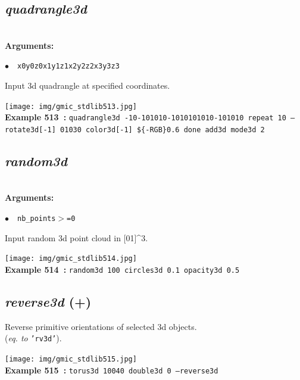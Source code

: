 \documentclass[a4paper,10.5pt,twoside]{book}
\def\comma{\discretionary{,}{}{,}}
\newcommand{\Cb}[1]{\textcolor{cb}{#1}}
\begin{document}
\subsection{\emph{quadrangle3d} }\vspace*{-0.7em}
~\\\textbf{\Cb{Arguments: }}\begin{flushleft}
{\small \Cb{\hspace*{0.5cm}$\bullet$~~\texttt{x0{\comma}y0{\comma}z0{\comma}x1{\comma}y1{\comma}z1{\comma}x2{\comma}y2{\comma}z2{\comma}x3{\comma}y3{\comma}z3}}}\end{flushleft}
Input 3d quadrangle at specified coordinates.
\begin{center}\texttt{[image: img/gmic\_stdlib513.jpg]}\\
{\footnotesize \textbf{Example 513~:} \texttt{quadrangle3d -10{\comma}-10{\comma}10{\comma}10{\comma}-10{\comma}10{\comma}10{\comma}10{\comma}10{\comma}-10{\comma}10{\comma}10 repeat 10 --rotate3d[-1] 0{\comma}1{\comma}0{\comma}30 color3d[-1] \$\{-RGB\}{\comma}0.6 done add3d mode3d 2}}
\end{center}

\subsection{\emph{random3d} }\vspace*{-0.7em}
~\\\textbf{\Cb{Arguments: }}\begin{flushleft}
{\small \Cb{\hspace*{0.5cm}$\bullet$~~\texttt{nb\_points$>$=0}}}\end{flushleft}
Input random 3d point cloud in [0{\comma}1]\textasciicircum 3.
\begin{center}\texttt{[image: img/gmic\_stdlib514.jpg]}\\
{\footnotesize \textbf{Example 514~:} \texttt{random3d 100 circles3d 0.1 opacity3d 0.5}}
\end{center}

\subsection{\emph{reverse3d} (+)}\vspace*{-0.7em}
Reverse primitive orientations of selected 3d objects.
~\\(\emph{eq. to} {\small \texttt{'rv3d'}}).
\begin{center}\texttt{[image: img/gmic\_stdlib515.jpg]}\\
{\footnotesize \textbf{Example 515~:} \texttt{torus3d 100{\comma}40 double3d 0 --reverse3d}}
\end{center}
\end{document}
